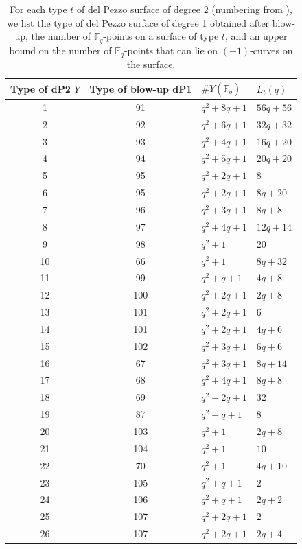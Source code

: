 \documentclass[a4paper, 11pt, reqno]{amsart}
\numberwithin{equation}{section} \numberwithin{figure}{section}
\def \F {{\mathbb F}}
\theoremstyle{definition}
\numberwithin{lemma}{section}
\begin{document}
\begin{longtable}[h]{|c|c|l|l|}
    \caption{For each type $t$ of del Pezzo surface of degree 2 (numbering from \cite[Table 2]{trepalin}), we list the type of del Pezzo surface of degree 1 obtained after blow-up, the number of $\F_q$-points on a surface of type $t$, and an upper bound on the number of $\F_q$-points that can lie on $(-1)$-curves on the surface.}\label{tab:dp2data}\\
    
    \hline
    Type of dP2 $Y$ & Type of blow-up dP1 & $\#Y(\F_q)$ & $L_t(q)$ \\
    \hline
    1 & 91 & $q^2 + 8q + 1$ & $56q + 56$ \\
2 & 92 & $q^2 + 6q + 1$ & $32q + 32$ \\
3 & 93 & $q^2 + 4q + 1$ & $16q + 20$ \\
4 & 94 & $q^2 + 5q + 1$ & $20q + 20$ \\
5 & 95 & $q^2 + 2q + 1$ & $8$ \\
6 & 95 & $q^2 + 2q + 1$ & $8q + 20$ \\
7 & 96 & $q^2 + 3q + 1$ & $8q + 8$ \\
8 & 97 & $q^2 + 4q + 1$ & $12q + 14$ \\
9 & 98 & $q^2 + 1$ & $20$ \\
10 & 66 & $q^2 + 1$ & $8q + 32$ \\
11 & 99 & $q^2 + q + 1$ & $4q + 8$ \\
12 & 100 & $q^2 + 2q + 1$ & $2q + 8$ \\
13 & 101 & $q^2 + 2q + 1$ & $6$ \\
14 & 101 & $q^2 + 2q + 1$ & $4q + 6$ \\
15 & 102 & $q^2 + 3q + 1$ & $6q + 6$ \\
16 & 67 & $q^2 + 3q + 1$ & $8q + 14$ \\
17 & 68 & $q^2 + 4q + 1$ & $8q + 8$ \\
18 & 69 & $q^2 - 2q + 1$ & $32$ \\
19 & 87 & $q^2 - q + 1$ & $8$ \\
20 & 103 & $q^2 + 1$ & $2q + 8$ \\
21 & 104 & $q^2 + 1$ & $10$ \\
22 & 70 & $q^2 + 1$ & $4q + 10$ \\
23 & 105 & $q^2 + q + 1$ & $2$ \\
24 & 106 & $q^2 + q + 1$ & $2q + 2$ \\
25 & 107 & $q^2 + 2q + 1$ & $2$ \\
26 & 107 & $q^2 + 2q + 1$ & $2q + 4$ \\

\end{longtable}
\end{document}
